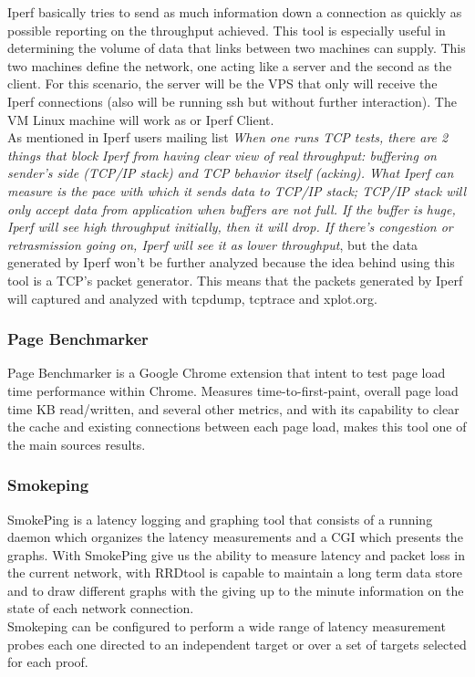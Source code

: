 Iperf basically tries to send as much information down a connection as quickly
as possible reporting on the throughput achieved. This tool is especially useful
in determining the volume of data that links between two machines can supply.
This two machines define the network, one acting like a server and the second as
the client. For this scenario, the server will be the VPS that only will receive
the Iperf connections (also will be running ssh but without further
interaction). The VM Linux machine will work as or Iperf Client.\\  

As mentioned in Iperf users mailing list \textit{
When one runs TCP tests, there are 2 things that block Iperf from having clear
view of real throughput: buffering on sender's side (TCP/IP stack) and TCP
behavior itself (acking). What Iperf can measure is the pace with which it
sends data to TCP/IP stack; TCP/IP stack will only accept data from application
when buffers are not full. If the buffer is huge, Iperf will see high
throughput initially, then it will drop. If there's congestion or retrasmission
going on, Iperf will see it as lower throughput}\cite{iperfmaillist}, but the
data generated by Iperf won't be further analyzed because the  idea behind using
this tool is a TCP's packet generator. This means that the packets generated by 
Iperf will captured and analyzed with tcpdump, tcptrace and xplot.org.\\

\subsubsection{Page Benchmarker}

Page Benchmarker is a Google Chrome extension that intent to test page load 
time performance within Chrome. Measures time-to-first-paint, overall page load 
time KB read/written, and several other metrics, and with its capability to 
clear the cache and existing connections between each page load, makes this 
tool one of the main sources results.\\

\subsubsection{Smokeping}
SmokePing is a latency logging and graphing tool that consists of a running 
daemon which organizes the latency measurements and a CGI which presents the 
graphs. With SmokePing give us the ability to measure latency and packet loss 
in the current network, with RRDtool is capable to maintain a long term 
data store and to draw different graphs with the giving up to the minute 
information on the state of each network connection.\\

Smokeping can be configured to perform a wide range of latency measurement 
probes each one directed to an independent target or over a set of targets 
selected for each proof.\\
